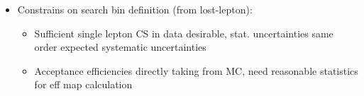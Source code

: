\documentclass{beamer}
\begin{document}
\begin{frame}
 \begin{itemize}
  \item Constrains on search bin definition (from lost-lepton):
  \begin{itemize}
   \item Sufficient single lepton CS in data desirable, stat. uncertainties same order expected systematic uncertainties
   \item Acceptance efficiencies directly taking from MC, need reasonable statistics for eff map calculation
  \end{itemize}
 \end{itemize}
  \begin{columns}
  \begin{column}{0.50\textwidth}
  \end{column}
 \begin{column}{0.50\textwidth}
   \begin{tikzpicture}

\end{tikzpicture}
\end{column}
\end{columns}
\end{frame}
\end{document}
